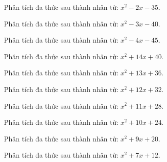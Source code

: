 \begin{bt}
	Phân tích đa thức sau thành nhân tử: $x^2 - 2 x - 35$.
\end{bt}
\begin{bt}
	Phân tích đa thức sau thành nhân tử: $x^2 - 3 x - 40$.
\end{bt}
\begin{bt}
	Phân tích đa thức sau thành nhân tử: $x^2 - 4 x - 45$.
\end{bt}
\begin{bt}
	Phân tích đa thức sau thành nhân tử: $x^2 + 14 x + 40$.
\end{bt}
\begin{bt}
	Phân tích đa thức sau thành nhân tử: $x^2 + 13 x + 36$.
\end{bt}
\begin{bt}
	Phân tích đa thức sau thành nhân tử: $x^2 + 12 x + 32$.
\end{bt}
\begin{bt}
	Phân tích đa thức sau thành nhân tử: $x^2 + 11 x + 28$.
\end{bt}
\begin{bt}
	Phân tích đa thức sau thành nhân tử: $x^2 + 10 x + 24$.
\end{bt}
\begin{bt}
	Phân tích đa thức sau thành nhân tử: $x^2 + 9 x + 20$.
\end{bt}
\begin{bt}
	Phân tích đa thức sau thành nhân tử: $x^2 + 7 x + 12$.
\end{bt}
